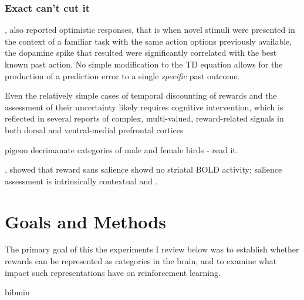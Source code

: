 \documentclass[doc,12pt]{apa}        %
\begin{document}
\subsubsection{Exact can't cut it}

, also reported optimistic responses, that is when novel stimuli were presented in the context of a familiar task with the same action options previously available, the dopamine spike that resulted were significantly correlated with the best known past action.  No simple modification to the TD equation allows for the production of a prediction error to a single \emph{specific} past outcome.

 Even the relatively simple cases of temporal discounting of rewards and the assessment of their uncertainty likely requires cognitive intervention, which is reflected in several reports of complex, multi-valued, reward-related signals in both dorsal and ventral-medial prefrontal cortices \cite{Tobler:2009p8302,Wallis:2010p8303,Kim:2009p8304,Seymour:2008p6518}


\cite{Nakamura:2006p9093} pigeon decrimanate categories of male and female birds - read it.

 , showed that reward sans salience showd no striatal BOLD activity; salience assessment is intrinsically contextual and .

\section{Goals and Methods}
\label{sec:goals}
The primary goal of this the experiments I review below was to establish whether rewards can be represented as categories in the brain, and to examine what impact such representations have on reinforcement learning.  

\newpage
 {bibmin}
\end{document}
